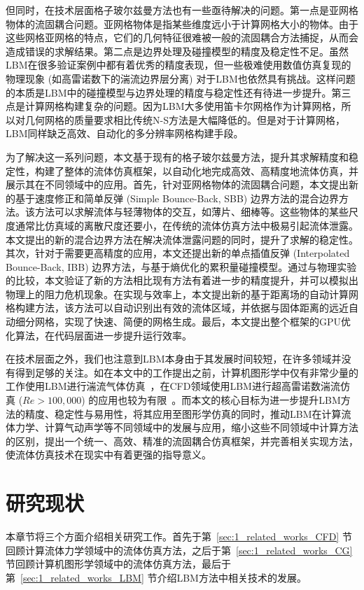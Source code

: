 但同时，在技术层面格子玻尔兹曼方法也有一些亟待解决的问题。第一点是亚网格物体的流固耦合问题。亚网格物体是指某些维度远小于计算网格大小的物体。由于这些网格亚网格的特点，它们的几何特征很难被一般的流固耦合方法捕捉，从而会造成错误的求解结果。第二点是边界处理及碰撞模型的精度及稳定性不足。虽然LBM在很多验证案例中都有着优秀的精度表现，但一些极难使用数值仿真复现的物理现象 (如高雷诺数下的湍流边界层分离) 对于LBM也依然具有挑战。这样问题的本质是LBM中的碰撞模型与边界处理的精度与稳定性还有待进一步提升。第三点是计算网格构建复杂的问题。因为LBM大多使用笛卡尔网格作为计算网格，所以对几何网格的质量要求相比传统N-S方法是大幅降低的。但是对于计算网格，LBM同样缺乏高效、自动化的多分辨率网格构建手段。

为了解决这一系列问题，本文基于现有的格子玻尔兹曼方法，提升其求解精度和稳定性，构建了整体的流体仿真框架，以自动化地完成高效、高精度地流体仿真，并展示其在不同领域中的应用。首先，针对亚网格物体的流固耦合问题，本文提出新的基于速度修正和简单反弹 (Simple Bounce-Back, SBB) 边界方法的混合边界方法。该方法可以求解流体与轻薄物体的交互，如薄片、细棒等。这些物体的某些尺度通常比仿真域的离散尺度还要小，在传统的流体仿真方法中极易引起流体泄露。本文提出的新的混合边界方法在解决流体泄露问题的同时，提升了求解的稳定性。其次，针对于需要更高精度的应用，本文还提出新的单点插值反弹 (Interpolated Bounce-Back, IBB) 边界方法，与基于熵优化的累积量碰撞模型。通过与物理实验的比较，本文验证了新的方法相比现有方法有着进一步的精度提升，并可以模拟出物理上的阻力危机现象。在实现与效率上，本文提出新的基于距离场的自动计算网格构建方法，该方法可以自动识别出有效的流体区域，并依据与固体距离的远近自动细分网格，实现了快速、简便的网格生成。最后，本文提出整个框架的GPU优化算法，在代码层面进一步提升运行效率。

在技术层面之外，我们也注意到LBM本身由于其发展时间较短，在许多领域并没有得到足够的关注。如在本文中的工作提出之前，计算机图形学中仅有非常少量的工作使用LBM进行湍流气体仿真~\citep{10.1109/TVCG.2012.303, Li-2019, Li-2020}，在CFD领域使用LBM进行超高雷诺数湍流仿真 ($Re>100,000$) 的应用也较为有限~\cite{10.1063/5.0046938}。而本文的核心目标为进一步提升LBM方法的精度、稳定性与易用性，将其应用至图形学仿真的同时，推动LBM在计算流体力学、计算气动声学等不同领域中的发展与应用，缩小这些不同领域中计算方法的区别，提出一个统一、高效、精准的流固耦合仿真框架，并完善相关实现方法，使流体仿真技术在现实中有着更强的指导意义。


\section{研究现状}
本章节将三个方面介绍相关研究工作。首先于第~\ref{sec:1_related_works_CFD} 节回顾计算流体力学领域中的流体仿真方法，之后于第~\ref{sec:1_related_works_CG} 节回顾计算机图形学领域中的流体仿真方法，最后于第~\ref{sec:1_related_works_LBM} 节介绍LBM方法中相关技术的发展。

